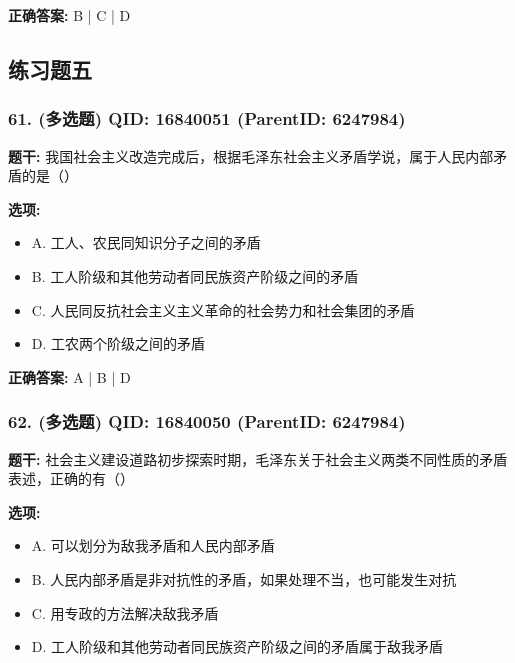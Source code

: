 \documentclass[12pt,UTF8]{ctexart}
\begin{document}
\textbf{正确答案:}
B | C | D

\vspace{0.3em}\hrulefill\vspace{0.7em}

\subsection*{练习题五}

\subsubsection*{61. (多选题) \small QID: 16840051 (ParentID: 6247984)}

\textbf{题干:}
我国社会主义改造完成后，根据毛泽东社会主义矛盾学说，属于人民内部矛盾的是（）



\textbf{选项:}
\begin{itemize}[leftmargin=*]

  \item A. 工人、农民同知识分子之间的矛盾

  \item B. 工人阶级和其他劳动者同民族资产阶级之间的矛盾

  \item C. 人民同反抗社会主义主义革命的社会势力和社会集团的矛盾

  \item D. 工农两个阶级之间的矛盾

\end{itemize}

\textbf{正确答案:}
A | B | D

\vspace{0.3em}\hrulefill\vspace{0.7em}

\subsubsection*{62. (多选题) \small QID: 16840050 (ParentID: 6247984)}

\textbf{题干:}
社会主义建设道路初步探索时期，毛泽东关于社会主义两类不同性质的矛盾表述，正确的有（）



\textbf{选项:}
\begin{itemize}[leftmargin=*]

  \item A. 可以划分为敌我矛盾和人民内部矛盾

  \item B. 人民内部矛盾是非对抗性的矛盾，如果处理不当，也可能发生对抗

  \item C. 用专政的方法解决敌我矛盾

  \item D. 工人阶级和其他劳动者同民族资产阶级之间的矛盾属于敌我矛盾

\end{itemize}
\end{document}
